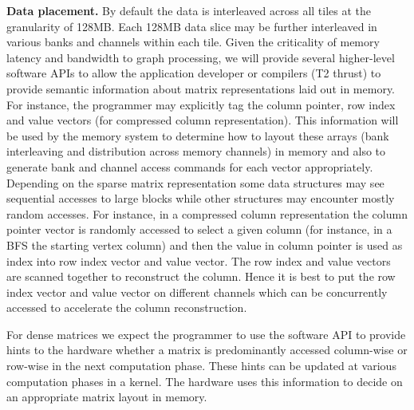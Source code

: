 \vspace{3pt}
\noindent
\textbf{Data placement.} 
By default the data is interleaved across all tiles at the granularity of 128MB. 
Each 128MB data slice may be further interleaved in various banks and channels within each tile.  
Given the criticality of memory latency and bandwidth to graph processing, we will provide several higher-level software APIs to allow the application developer or compilers (T2 thrust) to provide semantic information about matrix representations laid out in memory. 
For instance, the programmer may explicitly tag the column pointer, row index and value vectors (for compressed column representation). 
This information will be used by the memory system to determine how to layout these arrays (bank interleaving and distribution across memory channels) in memory and also to generate bank and channel access commands for each vector appropriately. 
Depending on the sparse matrix representation some data structures may see sequential accesses to large blocks while other structures may encounter mostly random accesses. For instance, in a compressed column  representation the column pointer vector is randomly accessed to select a given column (for instance, in a BFS the starting vertex column) and then the value in column pointer is used as index into row index  vector and value vector. The row index and value vectors are scanned together to reconstruct the column. Hence it is best to put the row index vector and value vector on different channels which can be concurrently accessed to accelerate the column reconstruction.  

For dense matrices we expect the programmer to use the software API to provide hints to the hardware whether a matrix is predominantly accessed column-wise or row-wise in the next computation phase. 
These hints can be updated at various computation phases in a kernel. The hardware uses this information to decide on an appropriate matrix layout in memory. 

